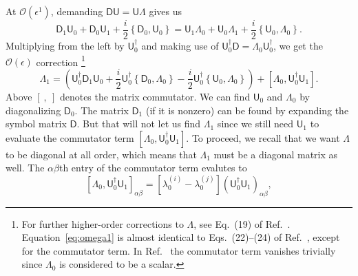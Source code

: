At $\mathcal{O}(\epsilon^{1})$, demanding $\mathsf{D}\mathsf{U} = \mathsf{U}\Lambda$ gives us
%
\begin{equation}
\mathsf{D}_{1}\mathsf{U}_{0} + \mathsf{D}_{0}\mathsf{U}_{1} + \frac{i}{2}\left\{\mathsf{D}_{0}, \mathsf{U}_{0}\right\} =
  \mathsf{U}_{1}\Lambda_{0} + \mathsf{U}_{0}\Lambda_{1} + \frac{i}{2}\left\{\mathsf{U}_{0}, \Lambda_{0}\right\}.
\end{equation}
%
Multiplying from the left by $\mathsf{U}_{0}^{\dagger}$ and making use of $\mathsf{U}_{0}^{\dagger}\mathsf{D} = \Lambda_{0}\mathsf{U}_{0}^{\dagger}$, we get the $\mathcal{O}(\epsilon)$ correction%
\footnote{For further higher-order corrections to $\Lambda$, see Eq.~(19) of Ref.~\cite{weigert1993}.
Equation~\eqref{eq:omega1} is almost identical to Eqs.~(22)--(24) of Ref.~\cite{venaille2022}, except for the commutator term.
In Ref.~\cite{venaille2022} the commutator term vanishes trivially since $\Lambda_{0}$ is considered to be a scalar.}
%
\begin{equation}
  \Lambda_{1} = \left(\mathsf{U}_{0}^{\dagger}\mathsf{D}_{1}\mathsf{U}_{0} +
  \frac{i}{2}\mathsf{U}_{0}^{\dagger}\left\{\mathsf{D}_{0},\Lambda_{0}\right\} - \frac{i}{2}\mathsf{U}_{0}^{\dagger}\left\{\mathsf{U}_{0},\Lambda_{0}\right\}\right) + \left[\Lambda_{0},\mathsf{U}_{0}^{\dagger}\mathsf{U}_{1}\right].
  \label{eq:omega1}
\end{equation}
%
Above $[~,~]$ denotes the matrix commutator.
We can find $\mathsf{U}_{0}$ and $\Lambda_{0}$ by diagonalizing $\mathsf{D}_{0}$.
The matrix $\mathsf{D}_{1}$ (if it is nonzero) can be found by expanding the symbol matrix $\mathsf{D}$.
But that will not let us find $\Lambda_{1}$ since we still need $\mathsf{U}_{1}$ to evaluate the commutator term $[\Lambda_{0},\mathsf{U}_{0}^{\dagger}\mathsf{U}_{1}]$.
To proceed, we recall that we want $\Lambda$ to be diagonal at all order, which means that $\Lambda_{1}$ must be a diagonal matrix as well.
The $\alpha\beta$th entry of the commutator term evalutes to
%
\begin{equation}
    \left[\Lambda_{0},\mathsf{U}_{0}^{\dagger}\mathsf{U}_{1}\right]_{\alpha\beta} = %
    \left[\lambda_{0}^{(i)} - \lambda_{0}^{(j)}\right]\left(\mathsf{U}_{0}^{\dagger}\mathsf{U}_{1}\right)_{\alpha\beta},
    \label{eq:diagonal}
\end{equation}
